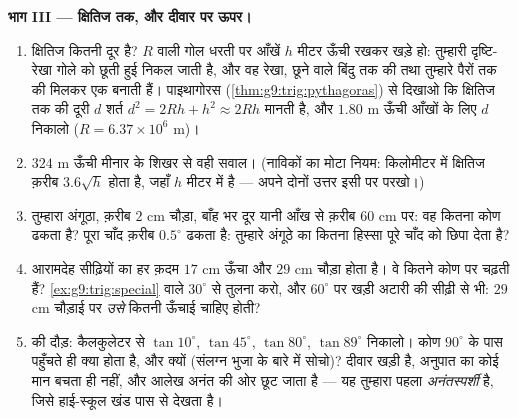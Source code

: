 \begin{problem}
\medskip
\noindent\textbf{भाग III --- क्षितिज तक, और दीवार पर ऊपर।}
\begin{enumerate}[resume]
  \item क्षितिज कितनी दूर है? $R$  वाली गोल धरती पर आँखें
        $h$ मीटर ऊँची रखकर खड़े हो: तुम्हारी दृष्टि-रेखा गोले को
        छूती हुई निकल जाती है, और वह रेखा, छूने वाले बिंदु तक की
         तथा तुम्हारे पैरों तक की  मिलकर एक  बनाती हैं। पाइथागोरस
        (\cref{thm:g9:trig:pythagoras}) से दिखाओ कि क्षितिज तक की
        दूरी $d$ शर्त $d^2 = 2Rh + h^2 \approx 2Rh$ मानती है, और
        $1.80$ m ऊँची आँखों के लिए $d$ निकालो
        ($R = 6.37 \times 10^6$ m)।
  \item $324$ m ऊँची मीनार के शिखर से वही सवाल। (नाविकों का मोटा
        नियम: किलोमीटर में क्षितिज क़रीब $3.6\sqrt{h}$ होता है, जहाँ
        $h$ मीटर में है --- अपने दोनों उत्तर इसी पर परखो।)
  \item तुम्हारा अंगूठा, क़रीब $2$ cm चौड़ा, बाँह भर दूर यानी आँख से
        क़रीब $60$ cm पर: वह कितना कोण ढकता है? पूरा चाँद क़रीब
        $0.5^\circ$ ढकता है: तुम्हारे अंगूठे का कितना हिस्सा पूरे
        चाँद को छिपा देता है?
  \item आरामदेह सीढ़ियों का हर क़दम $17$ cm ऊँचा और $29$ cm चौड़ा
        होता है। वे कितने कोण पर चढ़ती हैं? \cref{ex:g9:trig:special}
        वाले $30^\circ$ से तुलना करो, और $60^\circ$ पर खड़ी अटारी की
        सीढ़ी से भी: $29$ cm चौड़ाई पर \emph{उसे} कितनी ऊँचाई चाहिए
        होती?
  \item {} की दौड़: कैलकुलेटर से $\tan 10^\circ$,
        $\tan 45^\circ$, $\tan 80^\circ$, $\tan 89^\circ$ निकालो।
        कोण $90^\circ$ के पास पहुँचते ही क्या होता है, और क्यों
        (संलग्न भुजा के बारे में सोचो)? दीवार खड़ी है, अनुपात का कोई
        मान बचता ही नहीं, और आलेख अनंत की ओर छूट जाता है --- यह
        तुम्हारा पहला \emph{अनंतस्पर्शी} है, जिसे हाई-स्कूल खंड पास
        से देखता है।

\end{enumerate}
\end{problem}
